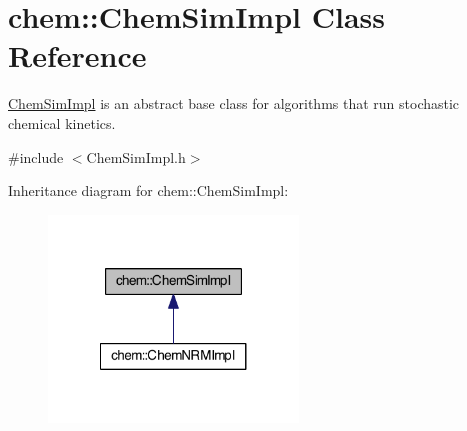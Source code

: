 \hypertarget{classchem_1_1ChemSimImpl}{\section{chem\-:\-:Chem\-Sim\-Impl Class Reference}
\label{classchem_1_1ChemSimImpl}
}


\hyperlink{classchem_1_1ChemSimImpl}{Chem\-Sim\-Impl} is an abstract base class for algorithms that run stochastic chemical kinetics.  




{\ttfamily \#include $<$Chem\-Sim\-Impl.\-h$>$}



Inheritance diagram for chem\-:\-:Chem\-Sim\-Impl\-:\nopagebreak
\begin{figure}[H]
\begin{center}
\leavevmode
\includegraphics[width=188pt]{classchem_1_1ChemSimImpl__inherit__graph}
\end{center}
\end{figure}

